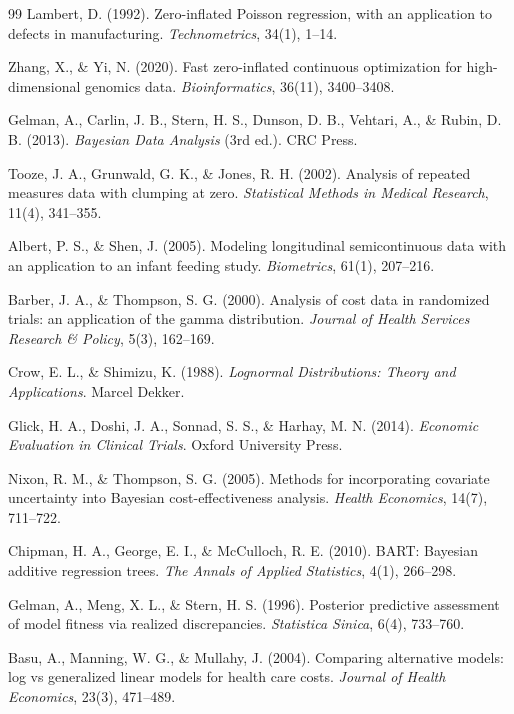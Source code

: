 \documentclass[11pt, a4paper]{article}
\begin{document}
\begin{thebibliography}{99}
 Lambert, D. (1992). Zero-inflated Poisson regression, with an application to defects in manufacturing. \textit{Technometrics}, 34(1), 1--14.

 Zhang, X., \& Yi, N. (2020). Fast zero-inflated continuous optimization for high-dimensional genomics data. \textit{Bioinformatics}, 36(11), 3400--3408.

 Gelman, A., Carlin, J. B., Stern, H. S., Dunson, D. B., Vehtari, A., \& Rubin, D. B. (2013). \textit{Bayesian Data Analysis} (3rd ed.). CRC Press.

 Tooze, J. A., Grunwald, G. K., \& Jones, R. H. (2002). Analysis of repeated measures data with clumping at zero. \textit{Statistical Methods in Medical Research}, 11(4), 341--355.

 Albert, P. S., \& Shen, J. (2005). Modeling longitudinal semicontinuous data with an application to an infant feeding study. \textit{Biometrics}, 61(1), 207--216.

 Barber, J. A., \& Thompson, S. G. (2000). Analysis of cost data in randomized trials: an application of the gamma distribution. \textit{Journal of Health Services Research \& Policy}, 5(3), 162--169.

 Crow, E. L., \& Shimizu, K. (1988). \textit{Lognormal Distributions: Theory and Applications}. Marcel Dekker.

 Glick, H. A., Doshi, J. A., Sonnad, S. S., \& Harhay, M. N. (2014). \textit{Economic Evaluation in Clinical Trials}. Oxford University Press.

 Nixon, R. M., \& Thompson, S. G. (2005). Methods for incorporating covariate uncertainty into Bayesian cost-effectiveness analysis. \textit{Health Economics}, 14(7), 711--722.

 Chipman, H. A., George, E. I., \& McCulloch, R. E. (2010). BART: Bayesian additive regression trees. \textit{The Annals of Applied Statistics}, 4(1), 266--298.

 Gelman, A., Meng, X. L., \& Stern, H. S. (1996). Posterior predictive assessment of model fitness via realized discrepancies. \textit{Statistica Sinica}, 6(4), 733--760.

 Basu, A., Manning, W. G., \& Mullahy, J. (2004). Comparing alternative models: log vs generalized linear models for health care costs. \textit{Journal of Health Economics}, 23(3), 471--489.


\end{thebibliography}
\end{document}
